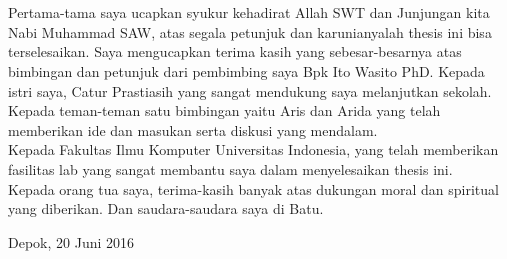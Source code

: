 \chapter*{\kataPengantar}
Pertama-tama saya ucapkan syukur kehadirat Allah SWT dan Junjungan kita Nabi Muhammad SAW, atas segala petunjuk dan karunianyalah thesis ini bisa terselesaikan. Saya mengucapkan terima kasih yang sebesar-besarnya atas bimbingan dan petunjuk dari pembimbing saya Bpk Ito Wasito PhD. Kepada istri saya, Catur Prastiasih yang sangat mendukung  saya melanjutkan sekolah. Kepada teman-teman satu bimbingan yaitu Aris dan Arida yang telah memberikan ide dan masukan serta diskusi yang mendalam. \\
Kepada Fakultas Ilmu Komputer Universitas Indonesia, yang telah memberikan fasilitas lab yang sangat membantu saya dalam menyelesaikan thesis ini. \\
Kepada orang tua saya, terima-kasih banyak atas dukungan moral dan spiritual yang diberikan. Dan saudara-saudara saya di Batu.

\vspace*{0.1cm}
\begin{flushright}
Depok, 20 Juni 2016\\[0.1cm]
\vspace*{1cm}
\penulis

\end{flushright}